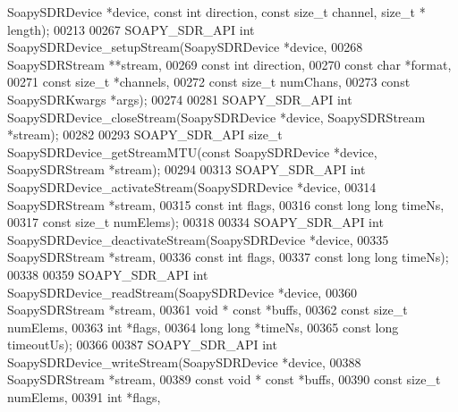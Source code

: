 \begin{DoxyCode}
      SoapySDRDevice *device, \textcolor{keyword}{const} \textcolor{keywordtype}{int} direction, \textcolor{keyword}{const} \textcolor{keywordtype}{size\_t} channel, \textcolor{keywordtype}{size\_t} *
      length);
00213 
00267 SOAPY_SDR_API \textcolor{keywordtype}{int} SoapySDRDevice_setupStream(SoapySDRDevice *device,
00268     SoapySDRStream **stream,
00269     \textcolor{keyword}{const} \textcolor{keywordtype}{int} direction,
00270     \textcolor{keyword}{const} \textcolor{keywordtype}{char} *format,
00271     \textcolor{keyword}{const} \textcolor{keywordtype}{size\_t} *channels,
00272     \textcolor{keyword}{const} \textcolor{keywordtype}{size\_t} numChans,
00273     \textcolor{keyword}{const} SoapySDRKwargs *args);
00274 
00281 SOAPY_SDR_API \textcolor{keywordtype}{int} SoapySDRDevice_closeStream(SoapySDRDevice *device, 
      SoapySDRStream *stream);
00282 
00293 SOAPY_SDR_API \textcolor{keywordtype}{size\_t} SoapySDRDevice_getStreamMTU(\textcolor{keyword}{const} SoapySDRDevice *device, 
      SoapySDRStream *stream);
00294 
00313 SOAPY_SDR_API \textcolor{keywordtype}{int} SoapySDRDevice_activateStream(SoapySDRDevice *device,
00314     SoapySDRStream *stream,
00315     \textcolor{keyword}{const} \textcolor{keywordtype}{int} flags,
00316     \textcolor{keyword}{const} \textcolor{keywordtype}{long} \textcolor{keywordtype}{long} timeNs,
00317     \textcolor{keyword}{const} \textcolor{keywordtype}{size\_t} numElems);
00318 
00334 SOAPY_SDR_API \textcolor{keywordtype}{int} SoapySDRDevice_deactivateStream(SoapySDRDevice *device,
00335     SoapySDRStream *stream,
00336     \textcolor{keyword}{const} \textcolor{keywordtype}{int} flags,
00337     \textcolor{keyword}{const} \textcolor{keywordtype}{long} \textcolor{keywordtype}{long} timeNs);
00338 
00359 SOAPY_SDR_API \textcolor{keywordtype}{int} SoapySDRDevice_readStream(SoapySDRDevice *device,
00360     SoapySDRStream *stream,
00361     \textcolor{keywordtype}{void} * \textcolor{keyword}{const} *buffs,
00362     \textcolor{keyword}{const} \textcolor{keywordtype}{size\_t} numElems,
00363     \textcolor{keywordtype}{int} *flags,
00364     \textcolor{keywordtype}{long} \textcolor{keywordtype}{long} *timeNs,
00365     \textcolor{keyword}{const} \textcolor{keywordtype}{long} timeoutUs);
00366 
00387 SOAPY_SDR_API \textcolor{keywordtype}{int} SoapySDRDevice_writeStream(SoapySDRDevice *device,
00388     SoapySDRStream *stream,
00389     \textcolor{keyword}{const} \textcolor{keywordtype}{void} * \textcolor{keyword}{const} *buffs,
00390     \textcolor{keyword}{const} \textcolor{keywordtype}{size\_t} numElems,
00391     \textcolor{keywordtype}{int} *flags,

\end{DoxyCode}
